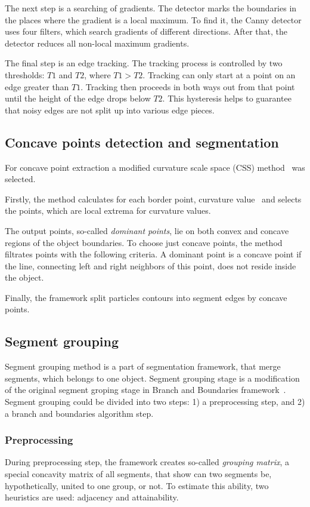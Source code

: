 \documentclass{lutmscthesis}[2010/09/22]
\begin{document}
The next step is a searching of gradients. The detector marks the boundaries in the places where the gradient is a local maximum. To find it, the Canny detector uses four filters, which search gradients of different directions. After that, the detector reduces all non-local maximum gradients.

The final step is an edge tracking. The tracking process is controlled by two thresholds: $T1$ and $T2$, where $T1 > T2$. Tracking can only start at a point on an edge greater than $T1$. Tracking then proceeds in both ways out from that point until the height of the edge drops below $T2$. This hysteresis helps to guarantee that noisy edges are not split up into various edge pieces.

\subsection{Concave points detection and segmentation}

For concave point extraction a modified curvature scale space (CSS) method~\cite{CSS} was selected. 

Firstly, the method calculates for each border point, curvature value~\cite{CSS} and selects the points, which are local extrema for curvature values.  

The output points, so-called \textit{dominant points}, lie on both convex and concave regions of the object boundaries. To choose just concave points, the method filtrates points with the following criteria. A dominant point is a concave point if the line, connecting left and right neighbors of this point, does not reside inside the object. 

Finally, the framework split particles contours into segment edges by concave points.

\subsection{Segment grouping}

Segment grouping method is a part of segmentation framework, that merge segments, which belongs to one object. Segment grouping stage is a modification of the original segment groping stage in Branch and Boundaries framework~\cite{zafari-bb}.  Segment grouping could be divided into two steps: 1) a preprocessing step, and 2) a branch and boundaries algorithm step.

\subsubsection{Preprocessing} 
During preprocessing step, the framework creates so-called \textit{grouping matrix}, a special concavity matrix of all segments, that show can two segments be, hypothetically, united to one group, or not. To estimate this ability, two heuristics are used: adjacency and attainability.
\end{document}
